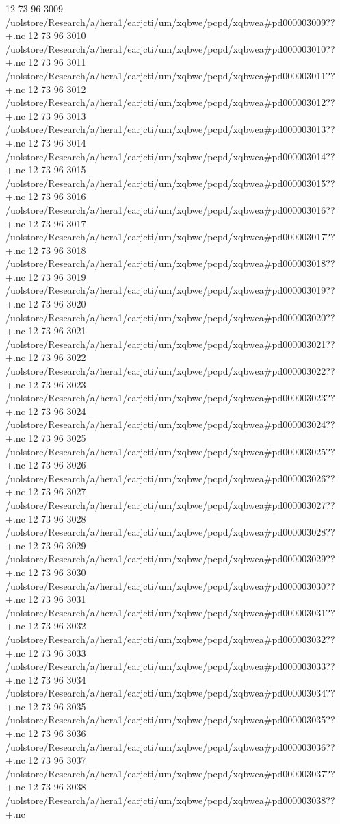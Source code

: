 12 73 96
3009
/uolstore/Research/a/hera1/earjcti/um/xqbwe/pcpd/xqbwea#pd000003009??+.nc
12 73 96
3010
/uolstore/Research/a/hera1/earjcti/um/xqbwe/pcpd/xqbwea#pd000003010??+.nc
12 73 96
3011
/uolstore/Research/a/hera1/earjcti/um/xqbwe/pcpd/xqbwea#pd000003011??+.nc
12 73 96
3012
/uolstore/Research/a/hera1/earjcti/um/xqbwe/pcpd/xqbwea#pd000003012??+.nc
12 73 96
3013
/uolstore/Research/a/hera1/earjcti/um/xqbwe/pcpd/xqbwea#pd000003013??+.nc
12 73 96
3014
/uolstore/Research/a/hera1/earjcti/um/xqbwe/pcpd/xqbwea#pd000003014??+.nc
12 73 96
3015
/uolstore/Research/a/hera1/earjcti/um/xqbwe/pcpd/xqbwea#pd000003015??+.nc
12 73 96
3016
/uolstore/Research/a/hera1/earjcti/um/xqbwe/pcpd/xqbwea#pd000003016??+.nc
12 73 96
3017
/uolstore/Research/a/hera1/earjcti/um/xqbwe/pcpd/xqbwea#pd000003017??+.nc
12 73 96
3018
/uolstore/Research/a/hera1/earjcti/um/xqbwe/pcpd/xqbwea#pd000003018??+.nc
12 73 96
3019
/uolstore/Research/a/hera1/earjcti/um/xqbwe/pcpd/xqbwea#pd000003019??+.nc
12 73 96
3020
/uolstore/Research/a/hera1/earjcti/um/xqbwe/pcpd/xqbwea#pd000003020??+.nc
12 73 96
3021
/uolstore/Research/a/hera1/earjcti/um/xqbwe/pcpd/xqbwea#pd000003021??+.nc
12 73 96
3022
/uolstore/Research/a/hera1/earjcti/um/xqbwe/pcpd/xqbwea#pd000003022??+.nc
12 73 96
3023
/uolstore/Research/a/hera1/earjcti/um/xqbwe/pcpd/xqbwea#pd000003023??+.nc
12 73 96
3024
/uolstore/Research/a/hera1/earjcti/um/xqbwe/pcpd/xqbwea#pd000003024??+.nc
12 73 96
3025
/uolstore/Research/a/hera1/earjcti/um/xqbwe/pcpd/xqbwea#pd000003025??+.nc
12 73 96
3026
/uolstore/Research/a/hera1/earjcti/um/xqbwe/pcpd/xqbwea#pd000003026??+.nc
12 73 96
3027
/uolstore/Research/a/hera1/earjcti/um/xqbwe/pcpd/xqbwea#pd000003027??+.nc
12 73 96
3028
/uolstore/Research/a/hera1/earjcti/um/xqbwe/pcpd/xqbwea#pd000003028??+.nc
12 73 96
3029
/uolstore/Research/a/hera1/earjcti/um/xqbwe/pcpd/xqbwea#pd000003029??+.nc
12 73 96
3030
/uolstore/Research/a/hera1/earjcti/um/xqbwe/pcpd/xqbwea#pd000003030??+.nc
12 73 96
3031
/uolstore/Research/a/hera1/earjcti/um/xqbwe/pcpd/xqbwea#pd000003031??+.nc
12 73 96
3032
/uolstore/Research/a/hera1/earjcti/um/xqbwe/pcpd/xqbwea#pd000003032??+.nc
12 73 96
3033
/uolstore/Research/a/hera1/earjcti/um/xqbwe/pcpd/xqbwea#pd000003033??+.nc
12 73 96
3034
/uolstore/Research/a/hera1/earjcti/um/xqbwe/pcpd/xqbwea#pd000003034??+.nc
12 73 96
3035
/uolstore/Research/a/hera1/earjcti/um/xqbwe/pcpd/xqbwea#pd000003035??+.nc
12 73 96
3036
/uolstore/Research/a/hera1/earjcti/um/xqbwe/pcpd/xqbwea#pd000003036??+.nc
12 73 96
3037
/uolstore/Research/a/hera1/earjcti/um/xqbwe/pcpd/xqbwea#pd000003037??+.nc
12 73 96
3038
/uolstore/Research/a/hera1/earjcti/um/xqbwe/pcpd/xqbwea#pd000003038??+.nc
